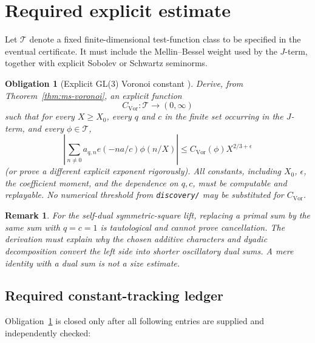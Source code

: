 \documentclass[12pt]{article}
\newtheorem{remark}[theorem]{Remark}
\newtheorem{obligation}{Obligation}[section]
\begin{document}
\section{Required explicit estimate}

Let \(\mathcal{T}\) denote a fixed finite-dimensional test-function class to be
specified in the eventual certificate.  It must include the Mellin--Bessel weight
used by the \(J\)-term, together with explicit Sobolev or Schwartz seminorms.

\begin{obligation}[Explicit GL(3) Voronoi constant {\normalfont [OBL]}]
\label{ob:explicit-voronoi}
Derive, from Theorem~\ref{thm:ms-voronoi}, an explicit function
\[
  C_{\mathrm{Vor}}\colon \mathcal{T}\to(0,\infty)
\]
such that for every \(X\ge X_0\), every \(q\) and \(c\) in the finite set
occurring in the \(J\)-term, and every \(\phi\in\mathcal{T}\),
\[
  \left|
    \sum_{n\neq0} a_{q,n} e(-na/c)\phi(n/X)
  \right|
  \le C_{\mathrm{Vor}}(\phi) X^{2/3+\epsilon}
\]
(or prove a different explicit exponent rigorously).  All constants, including
\(X_0\), \(\epsilon\), the coefficient moment, and the dependence on \(q,c\),
must be computable and replayable.  No numerical threshold from
\texttt{discovery/} may be substituted for \(C_{\mathrm{Vor}}\).
\end{obligation}

\begin{remark}
For the self-dual symmetric-square lift, replacing a primal sum by the same sum
with \(q=c=1\) is tautological and cannot prove cancellation.  The derivation
must explain why the chosen additive characters and dyadic decomposition convert
the left side into shorter oscillatory dual sums.  A mere identity with a dual
sum is not a size estimate.
\end{remark}

\subsection{Required constant-tracking ledger}

Obligation~\ref{ob:explicit-voronoi} is closed only after all following entries
are supplied and independently checked:
\end{document}
